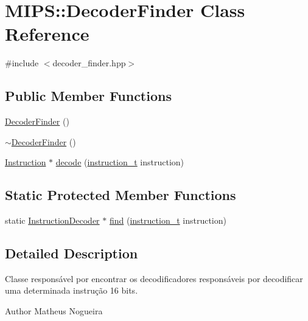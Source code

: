 \hypertarget{classMIPS_1_1DecoderFinder}{}\section{M\+I\+PS\+:\+:Decoder\+Finder Class Reference}
\label{classMIPS_1_1DecoderFinder}


{\ttfamily \#include $<$decoder\+\_\+finder.\+hpp$>$}

\subsection*{Public Member Functions}
\begin{DoxyCompactItemize}
\item 
\hyperlink{classMIPS_1_1DecoderFinder_ae4cf7a2edb104ff6ab61c69a8e4aa3da}{Decoder\+Finder} ()
\item 
\hyperlink{classMIPS_1_1DecoderFinder_a7338de0779c6ea514bbb7adf82da1c07}{$\sim$\+Decoder\+Finder} ()
\item 
\hyperlink{classMIPS_1_1Instruction}{Instruction} $\ast$ \hyperlink{classMIPS_1_1DecoderFinder_ade32de5a84c67c28c42b98ab891cf669}{decode} (\hyperlink{core_8hpp_aa514fd240a0e29abb2a2e4c805d7f1a4}{instruction\+\_\+t} instruction)
\end{DoxyCompactItemize}
\subsection*{Static Protected Member Functions}
\begin{DoxyCompactItemize}
\item 
static \hyperlink{classMIPS_1_1InstructionDecoder}{Instruction\+Decoder} $\ast$ \hyperlink{classMIPS_1_1DecoderFinder_a9ea34d6e420f684de5d6fe3b10ce5c6b}{find} (\hyperlink{core_8hpp_aa514fd240a0e29abb2a2e4c805d7f1a4}{instruction\+\_\+t} instruction)
\end{DoxyCompactItemize}


\subsection{Detailed Description}
Classe responsável por encontrar os decodificadores responsáveis por decodificar uma determinada instrução 16 bits.

\begin{DoxyAuthor}{Author}
Matheus Nogueira 
\end{DoxyAuthor}



